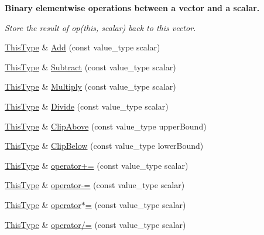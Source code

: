 \begin{Indent}{\bf Binary elementwise operations between a vector and a scalar.}\par
{\em Store the result of op(this, scalar) back to this vector. }\begin{DoxyCompactItemize}
\item 
\hyperlink{classvct_fixed_size_const_vector_base_a071063bc4fa43112cc287b2dbef53180}{This\-Type} \& \hyperlink{classvct_fixed_size_vector_base_af454b994920e2316f301e2fa5d751a12}{Add} (const value\-\_\-type scalar)
\item 
\hyperlink{classvct_fixed_size_const_vector_base_a071063bc4fa43112cc287b2dbef53180}{This\-Type} \& \hyperlink{classvct_fixed_size_vector_base_a823e5452eb0ce0498c1e00e9d575130f}{Subtract} (const value\-\_\-type scalar)
\item 
\hyperlink{classvct_fixed_size_const_vector_base_a071063bc4fa43112cc287b2dbef53180}{This\-Type} \& \hyperlink{classvct_fixed_size_vector_base_a458bd13f44fc4feefacdb095c892a117}{Multiply} (const value\-\_\-type scalar)
\item 
\hyperlink{classvct_fixed_size_const_vector_base_a071063bc4fa43112cc287b2dbef53180}{This\-Type} \& \hyperlink{classvct_fixed_size_vector_base_a198e711d14a4beea8ceb22bf9e95d4b9}{Divide} (const value\-\_\-type scalar)
\item 
\hyperlink{classvct_fixed_size_const_vector_base_a071063bc4fa43112cc287b2dbef53180}{This\-Type} \& \hyperlink{classvct_fixed_size_vector_base_a18fbb50c4b6f6312414250df67219ff0}{Clip\-Above} (const value\-\_\-type upper\-Bound)
\item 
\hyperlink{classvct_fixed_size_const_vector_base_a071063bc4fa43112cc287b2dbef53180}{This\-Type} \& \hyperlink{classvct_fixed_size_vector_base_a89cbd6554bb463ab106c245af55e5c17}{Clip\-Below} (const value\-\_\-type lower\-Bound)
\item 
\hyperlink{classvct_fixed_size_const_vector_base_a071063bc4fa43112cc287b2dbef53180}{This\-Type} \& \hyperlink{classvct_fixed_size_vector_base_ab76c0b091397a505293c61e25aa61508}{operator+=} (const value\-\_\-type scalar)
\item 
\hyperlink{classvct_fixed_size_const_vector_base_a071063bc4fa43112cc287b2dbef53180}{This\-Type} \& \hyperlink{classvct_fixed_size_vector_base_a15f566ac5136ad4ce72d95474d6024a3}{operator-\/=} (const value\-\_\-type scalar)
\item 
\hyperlink{classvct_fixed_size_const_vector_base_a071063bc4fa43112cc287b2dbef53180}{This\-Type} \& \hyperlink{classvct_fixed_size_vector_base_abbbb553f2bbecb7242da73c935214544}{operator$\ast$=} (const value\-\_\-type scalar)
\item 
\hyperlink{classvct_fixed_size_const_vector_base_a071063bc4fa43112cc287b2dbef53180}{This\-Type} \& \hyperlink{classvct_fixed_size_vector_base_acbd59665ba83f10e7ac127edfb871073}{operator/=} (const value\-\_\-type scalar)
\end{DoxyCompactItemize}
\end{Indent}
